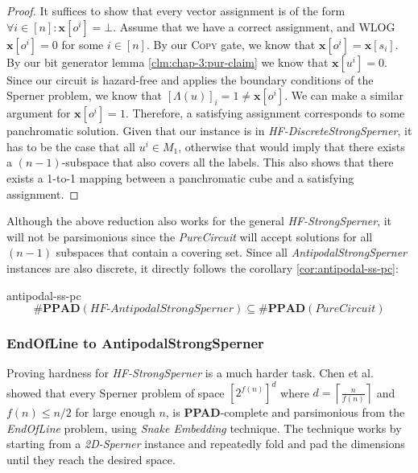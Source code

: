 \begin{proof}
    It suffices to show that every vector assignment is of the form $\forall i \in [n]: \mathbf{x}[o^i] = \bot$.
    Assume that we have a correct assignment, and WLOG $\mathbf{x}[o^i] = 0$  for some $i \in [n]$.
    By our \textsc{Copy} gate, we know that $\mathbf{x}[o^i]= \mathbf{x}[s_i]$.
    By our bit generator lemma \ref{clm:chap-3:pur-claim} we know that $\mathbf{x}[u^i] = 0$.
    Since our circuit is hazard-free and applies the boundary conditions of the Sperner problem, we know that
    $[\Lambda(u)]_i = 1 \neq \mathbf{x}[o^i]$. We can make a similar argument for $\mathbf{x}[o^i] = 1$.
    Therefore, a satisfying assignment corresponds to some panchromatic solution. Given that
    our instance is in \textit{HF-DiscreteStrongSperner}, it has to be the case that
    all $u^i \in M_1$, otherwise that would imply that there exists a $(n-1)$-subspace that also covers all the labels.
    This also shows that there exists a 1-to-1 mapping between a panchromatic cube and a satisfying assignment.
\end{proof}

Although the above reduction also works for the general \textit{HF-StrongSperner}, it will not be parsimonious since
the \textit{PureCircuit} will accept solutions for all $(n-1)$ subspaces that contain a covering set.
Since all \textit{AntipodalStrongSperner} instances are also discrete, it directly follows the
corollary \ref{cor:antipodal-ss-pc}:


\begin{corollarybox}{}{antipodal-ss-pc}
    $$
        \textbf{\#PPAD}(\textit{HF-AntipodalStrongSperner}) \subseteq \textbf{\#PPAD}(\textit{PureCircuit})
    $$
\end{corollarybox}




\subsubsection{EndOfLine to AntipodalStrongSperner}

Proving hardness for \textit{HF-StrongSperner} is a much harder task.
Chen et al. \cite{chen_SettlingComplexityComputing_2009}
showed that every
Sperner problem of space $[2^{f(n)}]^d$ where $d = \left\lceil \frac{n}{f(n)} \right\rceil$
and   $f(n) \leq n/2$ for large enough $n$,
is \textbf{PPAD}-complete and parsimonious from the \textit{EndOfLine} problem,
using \textit{Snake Embedding} technique.
The technique works by starting from a \textit{2D-Sperner} instance
and repeatedly fold and pad the dimensions until they reach the desired space.

